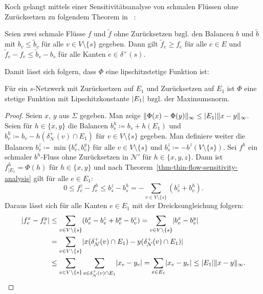 Koch gelangt mittels einer Sensitivitätsanalyse von schmalen Flüssen ohne Zurück\-setzen zu folgendem Theorem in ~\cite[Theorem 6.53]{Koch2012}:
\begin{theorem}\label{thm-thin-flow-sensitivity-analysis}
	Seien zwei schmale Flüsse $f$ und $\tilde{f}$ ohne Zurücksetzen bzgl. den Balancen $b$ und $\tilde{b}$ mit $b_v \leq \tilde{b}_v$ für alle $v\in V \setminus \{ s \}$ gegeben.
	Dann gilt $\tilde{f}_e \geq f_e$ für alle $e\in E$ und $\tilde{f}_e - f_e \leq \tilde{b}_s - b_s$ für alle Kanten $e\in\delta^+(s)$.
\end{theorem}

Damit lässt sich folgern, dass $\Phi$ eine lipschitzstetige Funktion ist:
\begin{corollary}
	Für ein $s$-Netzwerk mit Zurücksetzen auf $E_1$ und Zurücksetzen auf $E_1$ ist $\Phi$ eine stetige Funktion mit Lipschitzkonstante $\lvert E_1\rvert$ bzgl. der Maximumsnorm.
\end{corollary}
\begin{proof}
	Seien $x$, $y$ aus $\Sigma$ gegeben.
	Man zeige $\lVert\Phi(x) - \Phi(y)\rVert_\infty \leq \lvert E_1\rvert \lVert x- y\rVert_\infty $.
	Seien für $h\in \{ x,y \}$ die Balancen $b_s^h \coloneq b_s + h(E_1)$ und $b_v^h\coloneq b_v - h(\delta^+_\mathcal{N}(v) \cap E_1)$ für $v\in V\setminus\{ s\}$ gegeben.
	Man definiere weiter die Balancen $b_v^z \coloneq \min \{ b_v^x, b_v^y \}$ für alle $v\in V\setminus \{ s\}$ und $b_s^z\coloneq -b^z(V\setminus \{ s\})$.
	Sei $f^h$ ein schmaler $b^h$-Fluss ohne Zurücksetzen in $\mathcal{N}'$ für $h\in \{x, y, z\}$.
	Dann ist $f^h_{\mid E_1} = \Phi(h)$ für $h\in \{x,y \}$ und nach Theorem~\ref{thm-thin-flow-sensitivity-analysis} gilt für alle $e\in E_1$:
	\[
		0\leq f_e^z - f_e^h \leq b_s^z - b_s^h = - \sum_{v\in V\setminus\{ s\}} (b_v^z + b_v^h).
	\]
	Daraus lässt sich für alle Kanten $e\in E_1$ mit der Dreicksungleichung folgern:
	\setlength{\belowdisplayskip}{0em}
	\begin{align*}
		\lvert f_e^x - f_e^y\rvert &\leq \sum_{v\in V\setminus\{s \}} (b_v^x - b_v^z + b_v^y - b_v^z) = \sum_{v\in V\setminus\{s\}} \lvert b_v^x - b_v^y\rvert\\
		& = \sum_{v\in V\setminus\{s\}} \lvert x(\delta^+_\mathcal{N}(v) \cap E_1) - y(\delta^+_\mathcal{N}(v) \cap E_1)\rvert \\
		&\leq \sum_{v\in V\setminus\{ s\}} \sum_{e\in\delta^+_\mathcal{N}(v)\cap E_1} \lvert x_e - y_e\rvert = \sum_{e\in E_1} \lvert x_e - y_e\rvert \leq \lvert E_1\rvert \lVert x-y\rVert_\infty.
	\end{align*}
\end{proof}

